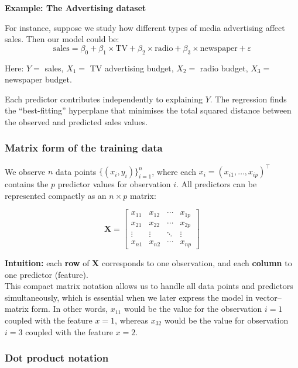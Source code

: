 \documentclass[
  letterpaper,
  DIV=11,
  numbers=noendperiod]{scrartcl}
\begin{document}
\textbf{Example: The Advertising dataset}

For instance, suppose we study how different types of media advertising
affect sales. Then our model could be:
\[\text{sales} = \beta_0 + \beta_1 \times \text{TV} + \beta_2 \times \text{radio} + \beta_3 \times \text{newspaper} + \varepsilon\]

Here: \(Y =\) sales, \(X_1 =\) TV advertising budget, \(X_2 =\) radio
budget, \(X_3 =\) newspaper budget.

Each predictor contributes independently to explaining \(Y\). The
regression finds the ``best-fitting'' hyperplane that minimises the
total squared distance between the observed and predicted sales values.

\subsubsection{Matrix form of the training
data}\label{matrix-form-of-the-training-data}

We observe \(n\) data points \(\{(x_i, y_i)\}_{i=1}^{n}\), where each
\(x_i = (x_{i1}, \ldots, x_{ip})^\top\) contains the \(p\) predictor
values for observation \(i\). All predictors can be represented
compactly as an \(n \times p\) matrix:

\[\mathbf{X} =
\begin{bmatrix}
x_{11} & x_{12} & \cdots & x_{1p} \\
x_{21} & x_{22} & \cdots & x_{2p} \\
\vdots & \vdots & \ddots & \vdots \\
x_{n1} & x_{n2} & \cdots & x_{np}
\end{bmatrix}\]

\textbf{Intuition:} each \textbf{row} of \(\mathbf{X}\) corresponds to
one observation, and each \textbf{column} to one predictor (feature).\\
This compact matrix notation allows us to handle all data points and
predictors simultaneously, which is essential when we later express the
model in vector--matrix form. In other words, \(x_{11}\) would be the
value for the observation \(i=1\) coupled with the feature \(x=1\),
whereas \(x_{32}\) would be the value for observation \(i=3\) coupled
with the feature \(x=2\).

\subsubsection{Dot product notation}\label{dot-product-notation}
\end{document}
